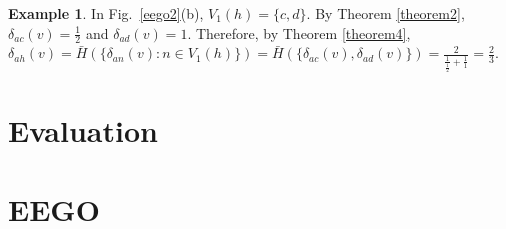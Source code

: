 \documentclass[preprint,12pt,authoryear]{elsarticle}
\newcommand{\D}[3]{\delta_{{#1}{#2}}({#3})}
\newcommand{\V}[2]{V_{#2}({#1})}
\newcommand{\LV}[2]{V_{\le #2}({#1})}
\newcommand{\XN}[1]{\mathcal{X}_{{#1}}}
\theoremstyle{definition}
\newtheorem{example}[theorem]{Example}
\begin{document}
\begin{example}
In Fig.~\ref{eego2}(b), %
$\V{h}{1} = \{c,d\}$.
By Theorem \ref{theorem2}, $\D{a}{c}{v}=\frac{1}{2}$ and $\D{a}{d}{v}=1$.
Therefore, by Theorem \ref{theorem4}, $\D{a}{h}{v}\!=\!\bar{H}(\{\D{a}{n}{v} : n \in \V{h}{1}\})\!=\!\bar{H}(\{\D{a}{c}{v},\D{a}{d}{v}\})\!=\!\frac{2}{\frac{1}{\frac{1}{2}} + \frac{1}{1}}=\frac{2}{3}$.  
 
\end{example}



\section{Evaluation}
\label{evaluation}

\section{EEGO}
\label{eego}
\end{document}
